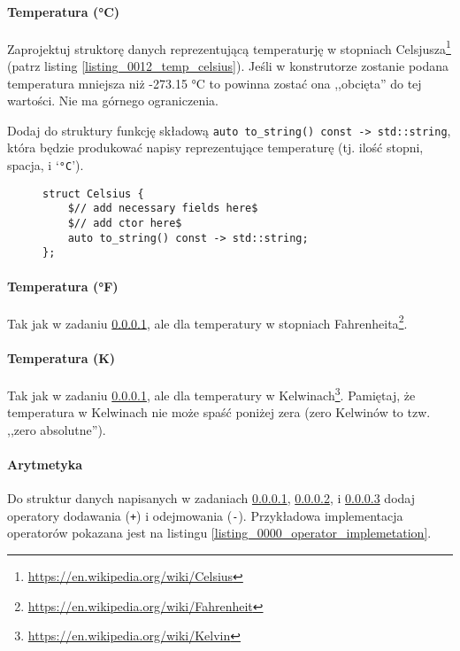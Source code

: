 \documentclass[11pt,a4paper,titlepage,onecolumn]{article}
\begin{document}
\paragraph{Temperatura (°C)}\label{ex_0000_struct_temperature_celsius}
Zaprojektuj struktorę danych reprezentującą temperaturję w stopniach
Celsjusza\footnote{\url{https://en.wikipedia.org/wiki/Celsius}} (patrz listing
\ref{listing_0012_temp_celsius}). Jeśli w konstrutorze zostanie podana
temperatura mniejsza niż -273.15 °C to powinna zostać ona ,,obcięta'' do tej
wartości. Nie ma górnego ograniczenia.

Dodaj do struktury funkcję składową \texttt{auto to\_string() const ->
std::string}, która będzie produkować napisy reprezentujące temperaturę (tj.
ilość stopni, spacja, i `\texttt{°C}').

\begin{figure}
{\small
\begin{lstlisting}[caption={struktura reprezentująca temperaturę w °C},
    captionpos=b,
    label=listing_0012_temp_celsius]
struct Celsius {
    $// add necessary fields here$
    $// add ctor here$
    auto to_string() const -> std::string;
};
\end{lstlisting}}
\end{figure}

\paragraph{Temperatura (°F)}\label{ex_0000_struct_temperature_fahrenheit} Tak jak w zadaniu
\ref{ex_0000_struct_temperature_celsius}, ale dla temperatury w stopniach
Fahrenheita\footnote{\url{https://en.wikipedia.org/wiki/Fahrenheit}}.

\paragraph{Temperatura (K)}\label{ex_0000_struct_temperature_kelvin} Tak jak w zadaniu
\ref{ex_0000_struct_temperature_celsius}, ale dla temperatury w
Kelwinach\footnote{\url{https://en.wikipedia.org/wiki/Kelvin}}. Pamiętaj, że
temperatura w Kelwinach nie może spaść poniżej zera (zero Kelwinów to tzw.
,,zero absolutne'').

\paragraph{Arytmetyka} Do struktur danych napisanych w zadaniach
\ref{ex_0000_struct_temperature_celsius},
\ref{ex_0000_struct_temperature_fahrenheit}, i
\ref{ex_0000_struct_temperature_kelvin} dodaj operatory dodawania (\texttt{+}) i
odejmowania (\texttt{-}). Przykładowa implementacja operatorów pokazana jest na
listingu \ref{listing_0000_operator_implemetation}.
\end{document}
